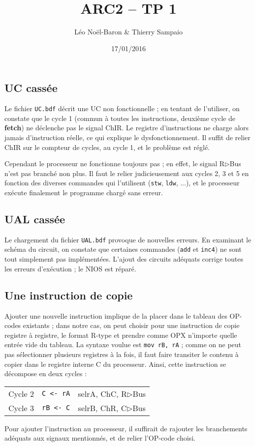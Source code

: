 \documentclass[a4paper,11pt]{article}
\title{ARC2 -- TP 1}
\author{Léo Noël-Baron \& Thierry Sampaio}
\date{17/01/2016}
\begin{document}
\maketitle

\subsection*{UC cassée}

Le fichier \verb?UC.bdf? décrit une UC non fonctionnelle ; en tentant de l'utiliser, on constate que le cycle 1 (commun à toutes les instructions, deuxième cycle de \textbf{fetch}) ne déclenche pas le signal ChIR. Le registre d'instructions ne charge alors jamais d'instruction réelle, ce qui explique le dysfonctionnement. Il suffit de relier ChIR sur le compteur de cycles, au cycle 1, et le problème est réglé.

Cependant le processeur ne fonctionne toujours pas ; en effet, le signal R$\triangleright$Bus n'est pas branché non plus. Il faut le relier judicieusement aux cycles 2, 3 et 5 en fonction des diverses commandes qui l'utilisent (\verb?stw?, \verb?ldw?, ...), et le processeur exécute finalement le programme chargé sans erreur.

\subsection*{UAL cassée}

Le chargement du fichier \verb?UAL.bdf? provoque de nouvelles erreurs. En examinant le schéma du circuit, on constate que certaines commandes (\verb?add? et \verb?inc4?) ne sont tout simplement pas implémentées. L'ajout des circuits adéquats corrige toutes les erreurs d'exécution ; le NIOS est réparé.

\subsection*{Une instruction de copie}

Ajouter une nouvelle instruction implique de la placer dans le tableau des OP-codes existants ; dans notre cas, on peut choisir pour une instruction de copie registre à registre, le format R-type et prendre comme OPX n'importe quelle entrée vide du tableau. La syntaxe voulue est \verb?mov rB, rA? ; comme on ne peut pas sélectionner plusieurs registres à la fois, il faut faire transiter le contenu à copier dans le registre interne C du processeur. Ainsi, cette instruction se décompose en deux cycles :

\begin{tabular}{c|c c}
Cycle 2 & \verb?C <- rA? & selrA, ChC, R$\triangleright$Bus \\
Cycle 3 & \verb?rB <- C? & selrB, ChR, C$\triangleright$Bus
\end{tabular}

Pour ajouter l'instruction au processeur, il suffirait de rajouter les branchements adéquats aux signaux mentionnés, et de relier l'OP-code choisi.
\end{document}
